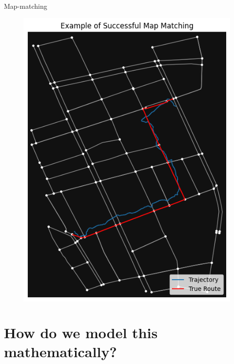 \documentclass[aspectratio=169, bigfiles, professionalfonts, hyperref={colorlinks=true, allcolors=., urlcolor=blue}]{beamer}
\begin{document}
\begin{frame}{Map-matching}
\begin{figure}
\begin{minipage}{.4\textwidth}
  \includegraphics[scale=.45]{trueroute.png}
  \label{fig:desired_res}
\end{minipage}
\end{figure}
\end{frame}

\section{How do we model this mathematically?}
\end{document}
